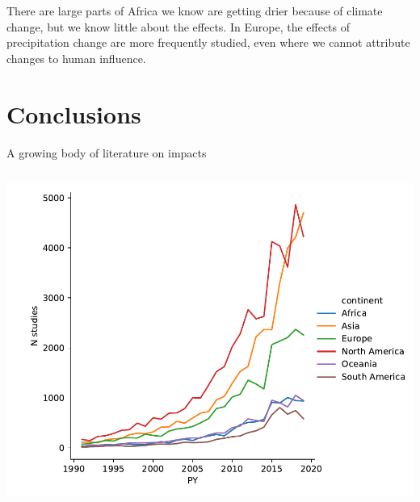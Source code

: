 \documentclass[9pt]{beamer}
\begin{document}
\begin{frame}{There are large parts of Africa we know are getting drier because of climate change, but we know little about the effects.}
In Europe, the effects of precipitation change are more frequently studied, even where we cannot attribute changes to human influence.

\end{frame}


\section{Conclusions}

\begin{frame}{A growing body of literature on impacts}

\begin{columns}
	\begin{column}{0.382\linewidth}
		\includegraphics[width=\linewidth]{../plots/literature_distribution/PY_continent_n.pdf}
		

\end{column}
\end{columns}
\end{frame}
\end{document}
